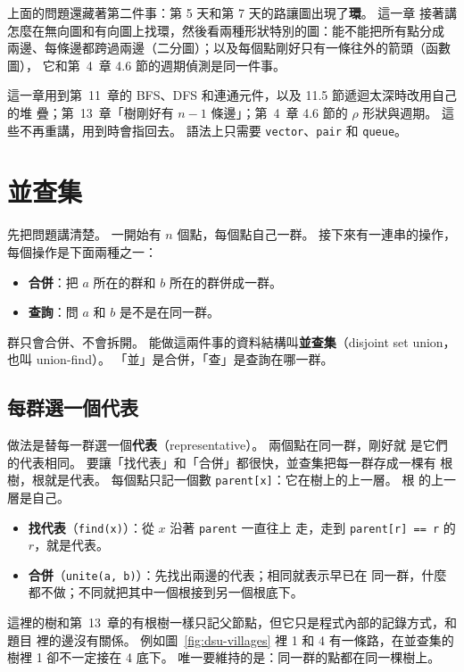 上面的問題還藏著第二件事：第 5 天和第 7 天的路讓圖出現了\textbf{環}。 這一章
接著講怎麼在無向圖和有向圖上找環，然後看兩種形狀特別的圖：能不能把所有點分成
兩邊、每條邊都跨過兩邊（二分圖）；以及每個點剛好只有一條往外的箭頭（函數圖），
它和第~4~章 4.6 節的週期偵測是同一件事。

這一章用到第~11~章的 BFS、DFS 和連通元件，以及 11.5 節遞迴太深時改用自己的堆
疊；第~13~章「樹剛好有 $n - 1$ 條邊」；第~4~章 4.6 節的 $\rho$ 形狀與週期。
這些不再重講，用到時會指回去。 語法上只需要 \texttt{vector}、\texttt{pair}
和 \texttt{queue}。

\section{並查集}
\label{sec:dsu}

先把問題講清楚。 一開始有 $n$ 個點，每個點自己一群。 接下來有一連串的操作，
每個操作是下面兩種之一：

\begin{itemize}
\item \textbf{合併}：把 $a$ 所在的群和 $b$ 所在的群併成一群。
\item \textbf{查詢}：問 $a$ 和 $b$ 是不是在同一群。
\end{itemize}

群只會合併、不會拆開。 能做這兩件事的資料結構叫\textbf{並查集}（disjoint set
union，也叫 union-find）。 「並」是合併，「查」是查詢在哪一群。

\subsection{每群選一個代表}

做法是替每一群選一個\textbf{代表}（representative）。 兩個點在同一群，剛好就
是它們的代表相同。 要讓「找代表」和「合併」都很快，並查集把每一群存成一棵有
根樹，根就是代表。 每個點只記一個數 \texttt{parent[x]}：它在樹上的上一層。 根
的上一層是自己。

\begin{itemize}
\item \textbf{找代表}（\texttt{find(x)}）：從 $x$ 沿著 \texttt{parent} 一直往上
走，走到 \texttt{parent[r] == r} 的 $r$，就是代表。
\item \textbf{合併}（\texttt{unite(a, b)}）：先找出兩邊的代表；相同就表示早已在
同一群，什麼都不做；不同就把其中一個根接到另一個根底下。
\end{itemize}

這裡的樹和第~13~章的有根樹一樣只記父節點，但它只是程式內部的記錄方式，和題目
裡的邊沒有關係。 例如圖~\ref{fig:dsu-villages} 裡 1 和 4 有一條路，在並查集的
樹裡 1 卻不一定接在 4 底下。 唯一要維持的是：同一群的點都在同一棵樹上。

